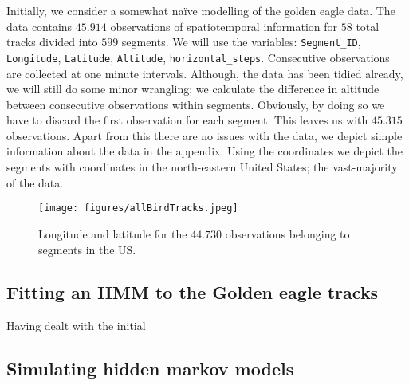 Initially, we consider a somewhat naïve modelling of the golden eagle data.\cite{eagleData} The data contains $45.914$ observations of spatiotemporal information for $58$ total tracks divided into $599$ segments. We will use the variables: \texttt{Segment\_ID}, \texttt{Longitude}, \texttt{Latitude}, \texttt{Altitude}, \texttt{horizontal\_steps}. Consecutive observations are collected at one minute intervals. Although, the data has been tidied already, we will still do some minor wrangling; we calculate the difference in altitude between consecutive observations within segments. Obviously, by doing so we have to discard the first observation for each segment. This leaves us with $45.315$ observations. Apart from this there are no issues with the data, we depict simple information about the data in the appendix. Using the coordinates we depict the segments with coordinates in the north-eastern United States; the vast-majority of the data.
\begin{figure}[h]
    \begin{center}
        \texttt{[image: figures/allBirdTracks.jpeg]}
        \caption{Longitude and latitude for the $44.730$ observations belonging to segments in the US.}
    \end{center}
\end{figure}
\subsection{Fitting an HMM to the Golden eagle tracks}
Having dealt with the initial 
\subsection{Simulating hidden markov models}

